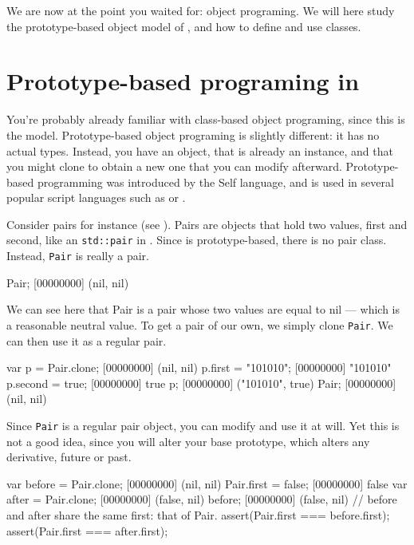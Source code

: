 
We are now at the point you waited for: object programing. We will
here study the prototype-based object model of \us, and how to
define and use classes.

\section{Prototype-based programing in \us}

You're probably already familiar with class-based object programing,
since this is the \Cxx model. Prototype-based object programing is
slightly different: it has no actual types. Instead, you have an
object, that is already an instance, and that you might clone to
obtain a new one that you can modify afterward. Prototype-based
programming was introduced by the Self language, and is used in
several popular script languages such as \io or \js.

Consider pairs for instance (see ). Pairs are objects
that hold two values,
first and second, like an \lstinline{std::pair} in \Cxx. Since \us is
prototype-based, there is no pair class. Instead, \lstinline|Pair| is
really a pair.

\begin{urbiscript}
Pair;
[00000000] (nil, nil)
\end{urbiscript}

We can see here that Pair is a pair whose two values are equal to nil
--- which is a reasonable neutral value. To get a pair of our own, we
simply clone \lstinline|Pair|. We can then use it as a
regular pair.

\begin{urbiscript}
var p = Pair.clone;
[00000000] (nil, nil)
p.first = "101010";
[00000000] "101010"
p.second = true;
[00000000] true
p;
[00000000] ("101010", true)
Pair;
[00000000] (nil, nil)
\end{urbiscript}

Since \lstinline|Pair| is a regular pair object, you can modify and
use it at will. Yet this is not a good idea, since you will alter your
base prototype, which alters any derivative, future or past.

\begin{urbiscript}
var before = Pair.clone;
[00000000] (nil, nil)
Pair.first = false;
[00000000] false
var after = Pair.clone;
[00000000] (false, nil)
before;
[00000000] (false, nil)
// before and after share the same first: that of Pair.
assert(Pair.first === before.first);
assert(Pair.first === after.first);
\end{urbiscript}

